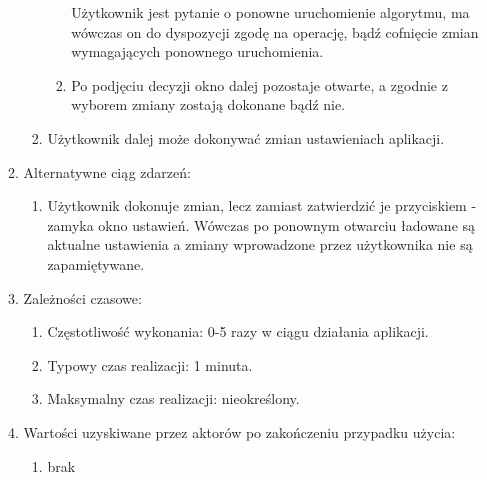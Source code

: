 \begin{par}
\begin{itemize}
\begin{enumerate}
\begin{enumerate}
\begin{enumerate}
			Użytkownik jest pytanie o ponowne uruchomienie algorytmu, ma wówczas on do dyspozycji zgodę na operację, bądź cofnięcie zmian wymagających ponownego uruchomienia.
			\item Po podjęciu decyzji okno dalej pozostaje otwarte, a zgodnie z wyborem zmiany zostają dokonane bądź nie.
		\end{enumerate}
		\item Użytkownik dalej może dokonywać zmian ustawieniach aplikacji.
		\end{enumerate}
	\item Alternatywne ciąg zdarzeń:
		\begin{enumerate}
		\item Użytkownik dokonuje zmian, lecz zamiast zatwierdzić je przyciskiem - zamyka okno ustawień. Wówczas po ponownym otwarciu ładowane są aktualne ustawienia a zmiany wprowadzone przez użytkownika nie są zapamiętywane.
		\end{enumerate}
	\item Zależności czasowe:
		\begin{enumerate}
		\item Częstotliwość wykonania: 0-5 razy w ciągu działania aplikacji.
		\item Typowy czas realizacji: 1 minuta.
		\item Maksymalny czas realizacji: nieokreślony.
		\end{enumerate}
	\item Wartości uzyskiwane przez aktorów po zakończeniu przypadku użycia:
		\begin{enumerate}
		\item brak
		\end{enumerate}
	\end{enumerate}


\end{itemize}
\end{par}
